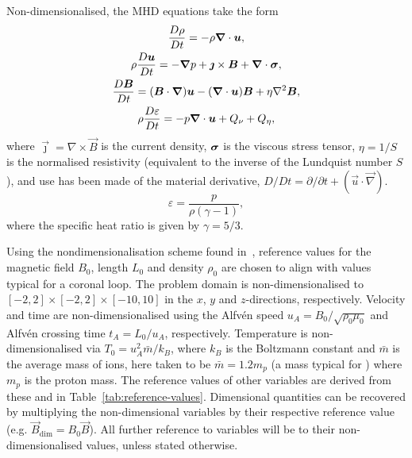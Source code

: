 Non-dimensionalised, the MHD equations take the form
\begin{gather}
\label{eq:mhda}
\frac{D\rho}{Dt} = - \rho \vec{\nabla} \cdot \vec{u},\\
\rho\frac{D\vec{u}}{Dt} = -\vec{\nabla} p + \vec{\jmath} \times \vec{B} + \vec{\nabla} \cdot \ten{\sigma},\\
\frac{D\vec{B}}{Dt} = (\vec{B} \cdot \vec{\nabla})\vec{u} - (\vec{\nabla} \cdot \vec{u})\vec{B} + \eta \nabla^2 \vec{B},\\
\rho\frac{D\varepsilon}{Dt} = -p \vec{\nabla} \cdot \vec{u} + {Q}_{\nu} + {Q}_{\eta},%
\label{eq:energy}
\end{gather}
where  $\vec{\jmath} = \nabla
\times \vec{B}$ is the current density, ${\bm \sigma}$ is the viscous
stress tensor, $\eta = 1/S$ is the normalised resistivity (equivalent
to the inverse of the Lundquist number $S$), and use has been made of
the material derivative, $D/Dt = \partial/\partial t + (\vec{u} \cdot
\vec{\nabla})$. 
\begin{equation}
\varepsilon = \frac{p}{\rho(\gamma - 1)},
\end{equation}
where the specific heat ratio is given by $\gamma = 5/3$. 

Using the nondimensionalisation scheme found
in~\cite{arberStaggeredGridLagrangian2001}, reference values for the
magnetic field $B_0$, length $L_0$ and density $\rho_0$ are chosen to
align with values typical for a coronal loop. The problem domain is
non-dimensionalised to $[-2,2] \times [-2,2] \times [-10,10]$ in the
$x$, $y$ and $z$-directions, respectively. Velocity and time are
non-dimensionalised using the Alfv\'en speed $u_A = B_0 / \sqrt{\rho_0
  \mu_0}$ and Alfv\'en crossing time $t_A = L_0/u_A$,
respectively. Temperature is non-dimensionalised via $T_0 = u_A^2
\bar{m} / k_B$, where $k_B$ is the Boltzmann constant and $\bar{m}$ is
the average mass of ions, here taken to be $\bar{m} = 1.2m_p$ (a mass
typical for ) where $m_p$ is the proton mass. The
reference values of other variables are derived from these
 and  in Table~\ref{tab:reference-values}. Dimensional quantities can be recovered by multiplying the non-dimensional variables by their respective reference value (e.g. $\vec{B}_{\dim} = B_0 \vec{B}$). All further reference to variables will be to their non-dimensionalised values, unless stated otherwise.

